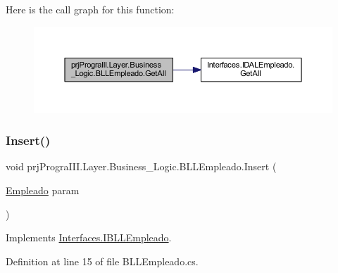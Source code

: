 Here is the call graph for this function\+:
\nopagebreak
\begin{figure}[H]
\begin{center}
\leavevmode
\includegraphics[width=350pt]{classprj_progra_i_i_i_1_1_layer_1_1_business___logic_1_1_b_l_l_empleado_a78943295f86576befb00a28f59f64b07_cgraph}
\end{center}
\end{figure}
\hypertarget{classprj_progra_i_i_i_1_1_layer_1_1_business___logic_1_1_b_l_l_empleado_a80ef323c864712e491fa040752455d0e}{}\label{classprj_progra_i_i_i_1_1_layer_1_1_business___logic_1_1_b_l_l_empleado_a80ef323c864712e491fa040752455d0e} 
\subsubsection{\texorpdfstring{Insert()}{Insert()}}
{\footnotesize\ttfamily void prj\+Progra\+I\+I\+I.\+Layer.\+Business\+\_\+\+Logic.\+B\+L\+L\+Empleado.\+Insert (\begin{DoxyParamCaption}\item[{\hyperlink{classprj_progra_i_i_i_1_1_layer_1_1_entities_1_1_empleado}{Empleado}}]{param }\end{DoxyParamCaption})}



Implements \hyperlink{interface_interfaces_1_1_i_b_l_l_empleado_ae42950dd884578920123132ef21224b1}{Interfaces.\+I\+B\+L\+L\+Empleado}.



Definition at line 15 of file B\+L\+L\+Empleado.\+cs.


